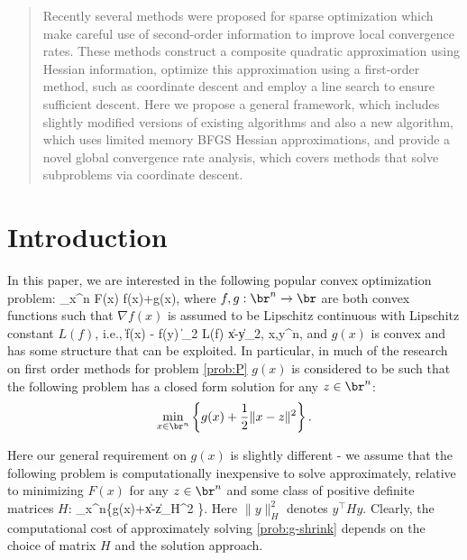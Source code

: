 \documentclass[11pt]{article}
\numberwithin{equation}{section}
\begin{document}
\begin{abstract}
Recently several methods were proposed for sparse optimization which make careful use of second-order information \cite{Hsieh2011,nGLMNET,Olsen2012,Chin2012} to improve local convergence  rates. These methods construct a composite quadratic  approximation using Hessian information, optimize this approximation using a first-order method, such as coordinate descent and employ a line search to  ensure sufficient descent.
Here we propose a general framework, which includes slightly modified versions of existing algorithms and also a new algorithm, which uses limited memory BFGS Hessian approximations,   and provide a novel global convergence rate analysis, which covers methods  that solve subproblems via  coordinate descent. 

\end{abstract}



\section{Introduction} %
\label{sec:introduction}
In this paper, we are interested in the following popular convex optimization problem: \bea\label{prob:P} \min_{x\in\br^n} F(x)\equiv
f(x)+g(x), \eea where $f,g:\br^n\rightarrow\br$ are both convex
functions such that  $\nabla f(x)$ is assumed to be Lipschitz continuous with Lipschitz constant $L(f)$, i.e., \beaa \|\nabla f(x) - \nabla f(y) \|_2 \leq L(f) \|x-y\|_2, \quad \forall x,y\in\br^n,\eeaa
and $g(x)$ is convex and has some structure that can be exploited. In particular,  in much of the research on first order methods for problem \eqref{prob:P}  $g(x)$ is considered to be such that   the following problem has a closed form solution
 for any $z\in\br^n$:
 \[\min_{x\in\br^n}\left\{g(x)+\frac{1}{2}\|x-z\|^2 \right\}.
 \]
 
 Here our general requirement on $g(x)$ is slightly different - we assume that the following problem is
 computationally inexpensive to solve approximately, relative to minimizing $F(x)$
 for any $z\in\br^n$ and some class of positive definite matrices $H$:
 \bea\label{prob:g-shrink}\min_{x\in\br^n}\left\{g(x)+\|x-z\|_H^2 \right\}.\eea
 Here $\|y\|^2_H$ denotes $y^\top H y$.   Clearly, the computational cost of approximately solving \eqref{prob:g-shrink} depends on the choice of matrix $H$ and the solution approach. 
 
\end{document}
